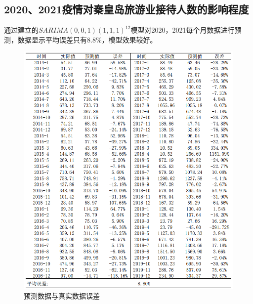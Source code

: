 	\subsection{2020、2021疫情对秦皇岛旅游业接待人数的影响程度}
	通过建立的$SARIMA(0,0,1)(1,1,1)^{12}$模型对2020，2021每个月数据进行预测，数据显示平均误差只有8.8\%，模型效果较好。
		\begin{figure}[htbp]
		\centering
		\includegraphics[scale=0.7,angle=0]{images/14.png}
		\caption{预测数据与真实数据误差}
		\label{14}
	\end{figure}


